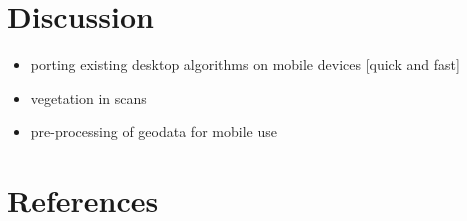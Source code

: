 \documentclass[review]{elsarticle}
\begin{document}
\section{Discussion}
\label{sec:discussion}

\begin{itemize}
\item porting existing desktop algorithms on mobile devices [quick and fast]
\item vegetation in scans
\item pre-processing of geodata for mobile use
\end{itemize}

\section*{References}


\end{document}
